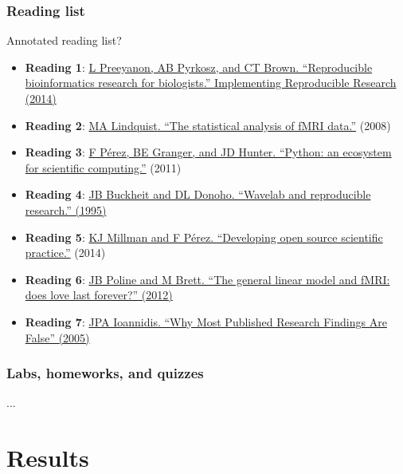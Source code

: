 \subsubsection{Reading list}

Annotated reading list?

\begin{itemize}
\item \textbf{Reading 1}: \href{https://osf.io/zqbu2}{L Preeyanon, AB Pyrkosz, and CT Brown.
             ``Reproducible bioinformatics research for biologists.''
Implementing Reproducible Research (2014)}
\item \textbf{Reading 2}: \href{http://arxiv.org/pdf/0906.3662v1}{MA Lindquist. ``The statistical analysis of fMRI data.''}
(2008)
\item \textbf{Reading 3}: \href{http://www.computer.org/cms/Computer.org/ComputingNow/issues/2015/04/T-mcs2011020013.pdf}{F P\'{e}rez, BE Granger, and JD Hunter.
              ``Python: an ecosystem for scientific computing.''}
(2011)
\item \textbf{Reading 4}: \href{http://statweb.stanford.edu/~wavelab/Wavelab_850/wavelab.pdf}{JB Buckheit and DL Donoho.
``Wavelab and reproducible research.'' (1995)}
\item \textbf{Reading 5}: \href{http://www.jarrodmillman.com/publications/millman2014developing.pdf}{KJ Millman and F P\'{e}rez.
              ``Developing open source scientific practice.''}
(2014)
\item \textbf{Reading 6}: \href{http://matthew.dynevor.org/_downloads/does_glm_love.pdf}{JB Poline and M Brett. ``The general linear model and fMRI: does love last forever?'' (2012)}
\item \textbf{Reading 7}: \href{http://journals.plos.org/plosmedicine/article?id=10.1371/journal.pmed.0020124}{JPA Ioannidis. ``Why Most Published Research Findings Are False'' (2005)}
\end{itemize}

\subsubsection{Labs, homeworks, and quizzes}


...


\section{Results}

